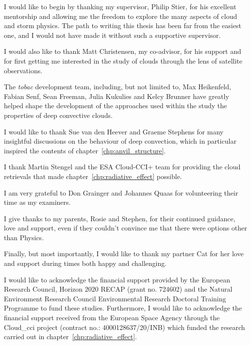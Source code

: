\begin{acknowledgements}

I would like to begin by thanking my supervisor, Philip Stier, for his excellent mentorship and allowing me the freedom to explore the many aspects of cloud and storm physics.
The path to writing this thesis has been far from the easiest one, and I would not have made it without such a supportive supervisor.

I would also like to thank Matt Christensen, my co-advisor, for his support and for first getting me interested in the study of clouds through the lens of satellite observations.

The \textit{tobac} development team, including, but not limited to, Max Heikenfeld, Fabian Senf, Sean Freeman, Julia Kukulies and Kelcy Brunner have greatly helped shape the development of the approaches used within the study the properties of deep convective clouds.

I would like to thank Sue van den Heever and Graeme Stephens for many insightful discussions on the behaviour of deep convection, which in particular inspired the contents of chapter~\ref{chp:anvil_structure}.

I thank Martin Stengel and the ESA Cloud-CCI+ team for providing the cloud retrievals that made chapter~\ref{chp:radiative_effect} possible.

I am very grateful to Don Grainger and Johannes Quaas for volunteering their time as my examiners.

I give thanks to my parents, Rosie and Stephen, for their continued guidance, love and support, even if they couldn't convince me that there were options other than Physics.

Finally, but most importantly, I would like to thank my partner Cat for her love and support during times both happy and challenging.




I would like to acknowledge the financial support provided by the European Research Council, Horizon 2020 RECAP (grant no. 724602) and the Natural Environment Research Council Environmental Research Doctoral Training Programme to fund these studies. Furthermore, I would like to acknowledge the financial support received from the European Space Agency through the Cloud\_cci project (contract no.: 4000128637/20/INB) which funded the research carried out in chapter~\ref{chp:radiative_effect}.

\end{acknowledgements}

